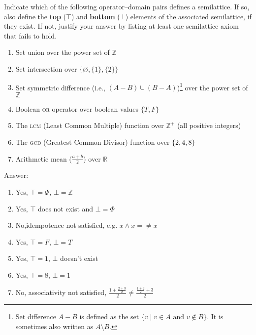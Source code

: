 \begin{problem}
Indicate which of the following operator--domain pairs defines a semilattice. If so, also define the \textbf{top} ($\top$) and \textbf{bottom} ($\bot$) elements of the associated semilattice, if they exist. If not, justify your answer by listing at least one semilattice axiom that fails to hold.
\begin{enumerate}
	\item Set union over the power set of $\mathbb{Z}$
	\item Set intersection over $\{\varnothing, \{1\}, \{2\}\}$
	\item Set symmetric difference (i.e., $(A - B) \cup (B - A)$)\footnote{Set difference $A - B$ is defined as the set $\{v \mid v \in A \text{ and } v \not\in B\}$. It is sometimes also written as $A \setminus B$.} over the power set of $\mathbb{Z}$
	\item Boolean \textsc{or} operator over boolean values $\{T, F\}$
	\item The \textsc{lcm} (Least Common Multiple) function over $\mathbb{Z}^+$ (all positive integers)
	\item The \textsc{gcd} (Greatest Common Divisor) function over $\{2,4,8\}$
	\item Arithmetic mean ($\frac{a+b}{2}$) over $\mathbb{R}$
\end{enumerate}

\item Answer:
\begin{enumerate}
	\item {\color{red}Yes, $\top = \Phi$, $\bot = \mathbb{Z}$}
	\item {\color{red}Yes, $\top$ does not exist and $\bot = \Phi$}
	\item {\color{red}No,idempotence not satisfied, e.g. $x \wedge x = {} \neq x$ }
	\item {\color{red}Yes, $\top = F$, $\bot = T$}
	\item {\color{red}Yes, $\top = 1$, $\bot$ doesn't exist}
	\item {\color{red}Yes, $\top = 8$, $\bot = 1$}
	\item {\color{red}No, associativity not satisfied, $\frac{1 + \frac{2+3}{2}}{2} \neq \frac{\frac{1+2}{2} + 3}{2}$ }
\end{enumerate}

\end{problem}



